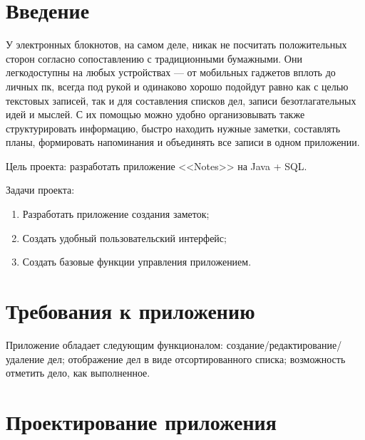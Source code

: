 \documentclass[a4paper,12pt]{article}
\begin{document}
\newpage
\section*{Введение}
У электронных блокнотов, на самом деле, никак не посчитать положительных сторон согласно сопоставлению с традиционными бумажными. Они легкодоступны на любых устройствах — от мобильных гаджетов вплоть до личных пк, всегда под рукой и одинаково хорошо подойдут равно как с целью текстовых записей, так и для составления списков дел, записи  безотлагательных идей и мыслей. С их помощью можно удобно организовывать также структурировать информацию, быстро находить нужные заметки, составлять планы, формировать напоминания и объединять все записи в одном приложении.

Цель проекта: разработать приложение <<Notes>> на Java + SQL.

Задачи проекта:
\begin{enumerate}
    \item Разработать приложение создания заметок;
    \item Создать удобный пользовательский интерфейс;
    \item Создать базовые функции управления приложением.
\end{enumerate}


\newpage
\section{Требования к приложению}
 Приложение обладает следующим функционалом: создание/редактирование/удаление дел; отображение дел в виде отсортированного списка; возможность отметить дело, как выполненное.



\newpage
\section{Проектирование приложения}
\end{document}
